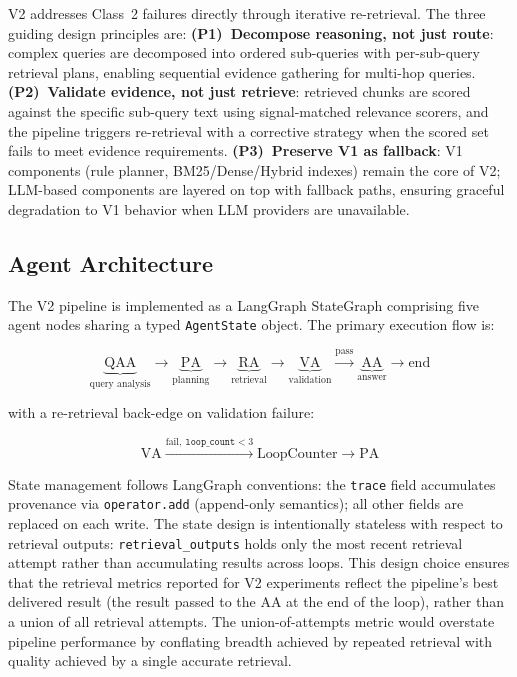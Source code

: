\documentclass[11pt, a4paper]{article}
\begin{document}
V2 addresses Class~2 failures directly through iterative re-retrieval. The three guiding design principles are: \textbf{(P1)~Decompose reasoning, not just route}: complex queries are decomposed into ordered sub-queries with per-sub-query retrieval plans, enabling sequential evidence gathering for multi-hop queries. \textbf{(P2)~Validate evidence, not just retrieve}: retrieved chunks are scored against the specific sub-query text using signal-matched relevance scorers, and the pipeline triggers re-retrieval with a corrective strategy when the scored set fails to meet evidence requirements. \textbf{(P3)~Preserve V1 as fallback}: V1 components (rule planner, BM25/Dense/Hybrid indexes) remain the core of V2; LLM-based components are layered on top with fallback paths, ensuring graceful degradation to V1 behavior when LLM providers are unavailable.

\subsection{Agent Architecture}

The V2 pipeline is implemented as a LangGraph StateGraph \citep{langgraph2024} comprising five agent nodes sharing a typed \texttt{AgentState} object. The primary execution flow is:

\begin{equation*}
\underbrace{\text{QAA}}_{\text{query analysis}} \to
\underbrace{\text{PA}}_{\text{planning}} \to
\underbrace{\text{RA}}_{\text{retrieval}} \to
\underbrace{\text{VA}}_{\text{validation}}
\xrightarrow{\text{pass}} \underbrace{\text{AA}}_{\text{answer}} \to \text{end}
\end{equation*}

\noindent with a re-retrieval back-edge on validation failure:

\begin{equation*}
\text{VA} \xrightarrow{\text{fail},\ \texttt{loop\_count} < 3} \text{LoopCounter} \to \text{PA}
\end{equation*}

State management follows LangGraph conventions: the \texttt{trace} field accumulates provenance via \texttt{operator.add} (append-only semantics); all other fields are replaced on each write. The state design is intentionally stateless with respect to retrieval outputs: \texttt{retrieval\_outputs} holds only the most recent retrieval attempt rather than accumulating results across loops. This design choice ensures that the retrieval metrics reported for V2 experiments reflect the pipeline's best delivered result (the result passed to the AA at the end of the loop), rather than a union of all retrieval attempts. The union-of-attempts metric would overstate pipeline performance by conflating breadth achieved by repeated retrieval with quality achieved by a single accurate retrieval.
\end{document}
